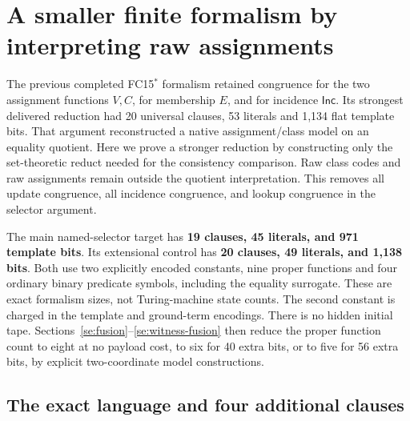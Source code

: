 \section{A smaller finite formalism by interpreting raw assignments}
\label{sec:selective-equality}

The previous completed FC15$^*$ formalism retained congruence for the two
assignment functions $V,C$, for membership $E$, and for incidence
$\mathsf{Inc}$. Its strongest delivered reduction had 20 universal clauses,
53 literals and 1,134 flat template bits. That argument reconstructed a
native assignment/class model on an equality quotient.
Here we prove a stronger reduction by constructing only the set-theoretic
reduct needed for the consistency comparison. Raw class codes and raw
assignments remain outside the quotient interpretation. This removes
all update congruence, all incidence congruence, and lookup congruence in
the selector argument.

The main named-selector target has \textbf{19 clauses, 45 literals, and
971 template bits}. Its extensional control has \textbf{20 clauses,
49 literals, and 1,138 bits}. Both use two explicitly encoded constants,
nine proper functions and four ordinary binary predicate symbols,
including the equality surrogate. These are exact formalism sizes,
not Turing-machine state counts. The second constant is charged in the
template and ground-term encodings. There is no hidden initial tape.
Sections~\ref{se:fusion}--\ref{se:witness-fusion} then reduce the proper
function count to eight at no payload cost, to six for 40 extra bits,
or to five for 56 extra bits, by explicit two-coordinate model constructions.

\subsection{The exact language and four additional clauses}

